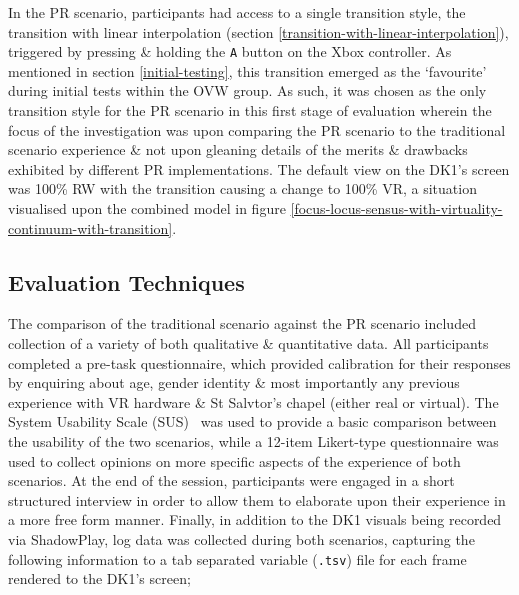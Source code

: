 In the PR scenario, participants had access to a single transition style, the transition with linear interpolation (section \ref{transition-with-linear-interpolation}), triggered by pressing \& holding the \texttt{A} button on the Xbox controller. As mentioned in section \ref{initial-testing}, this transition emerged as the `favourite' during initial tests within the OVW group. As such, it was chosen as the only transition style for the PR scenario in this first stage of evaluation wherein the focus of the investigation was upon comparing the PR scenario to the traditional scenario experience \& not upon gleaning details of the merits \& drawbacks exhibited by different PR implementations. The default view on the DK1's screen was 100\% RW with the transition causing a change to 100\% VR, a situation visualised upon the combined model in figure \ref{focus-locus-sensus-with-virtuality-continuum-with-transition}.


\subsection{Evaluation Techniques}

The comparison of the traditional scenario against the PR scenario included collection of a variety of both qualitative \& quantitative data. All participants completed a pre-task questionnaire, which provided calibration for their responses by enquiring about age, gender identity \& most importantly any previous experience with VR hardware \& St Salvtor's chapel (either real or virtual). The System Usability Scale (SUS)~\cite{Brooke1996} was used to provide a basic comparison between the usability of the two scenarios, while a 12-item Likert-type questionnaire was used to collect opinions on more specific aspects of the experience of both scenarios. At the end of the session, participants were engaged in a short structured interview in order to allow them to elaborate upon their experience in a more free form manner. Finally, in addition to the DK1 visuals being recorded via ShadowPlay, log data was collected during both scenarios, capturing the following information to a tab separated variable (\texttt{.tsv}) file for each frame rendered to the DK1's screen;


